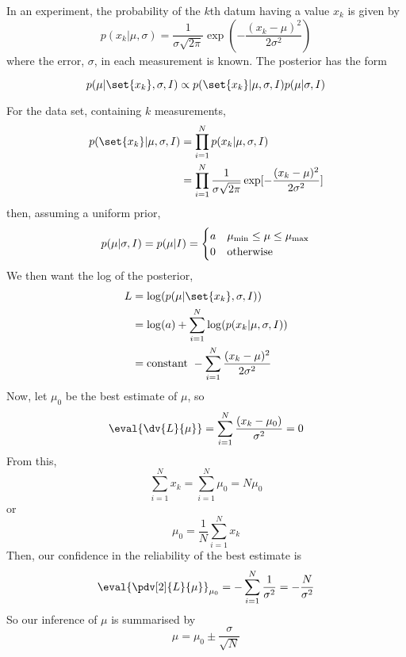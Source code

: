 \documentclass{dwnotes}         		        %
\begin{document}
\begin{example}
 In an experiment, the probability of the $k$th datum having a value $x_k$ is given by
\[ p(x_k | \mu, \sigma) = \frac{1}{\sigma \sqrt{2 \pi}} \exp( - \frac{(x_k-\mu)^2}{2 \sigma^2} )\]
where the error, $\sigma$, in each measurement is known. The posterior has the form

\[ p(\mu | \set{x_k}, \sigma, I) \propto p(\set{x_k} | \mu, \sigma, I)
p(\mu | \sigma, I ) \]

For the data set, containing $k$ measurements,
\begin{align*} 
p( \set{x_k} | \mu, \sigma,I) &= \prod_{i=1}^N p (x_k | \mu, \sigma, I) \\
&= \prod_{i=1}^N \frac{1}{\sigma \sqrt{2 \pi}} \exp[ - \frac{(x_k - \mu)^2}{2 \sigma^2}]
\end{align*}
then, assuming a uniform prior,
\begin{align*}
  p(\mu | \sigma, I) = p(\mu|I) =
  \begin{cases}
    a & \mu_{\rm min} \le \mu \le \mu_{\rm max} \\
0 & \text{otherwise}
  \end{cases}
\end{align*}
We then want the log of the posterior,
\begin{align*}
  L &= \log( p(\mu | \set{x_k}, \sigma, I) ) \\
&= \log(a) + \sum_{i=1}^N \log( p(x_k | \mu, \sigma, I) ) \\
&= \text{constant } - \sum_{i=1}^N \frac{(x_k - \mu)^2}{2 \sigma^2}
\end{align*}
Now, let $\mu_0$ be the best estimate of $\mu$, so
\begin{align*}
  \eval{ \dv{L}{\mu} } = \sum_{i=1}^N \frac{(x_k - \mu_0)}{\sigma^2} = 0
\end{align*}
From this,
\[ \sum_{i=1}^N x_k = \sum_{i=1}^N \mu_0 = N \mu_0 \]
or
\[ \mu_0 = \frac{1}{N} \sum_{i=1}^N x_k \]
Then, our confidence in the reliability of the best estimate is
\[ \eval{\pdv[2]{L}{\mu}}_{\mu_0} = - \sum_{i=1}^N \frac{1}{\sigma^2}
= - \frac{N}{\sigma^2} \]
So our inference of $\mu$ is summarised by
\[ \mu = \mu_0 \pm \frac{\sigma}{\sqrt{N}} \]
\end{example}
\end{document}
